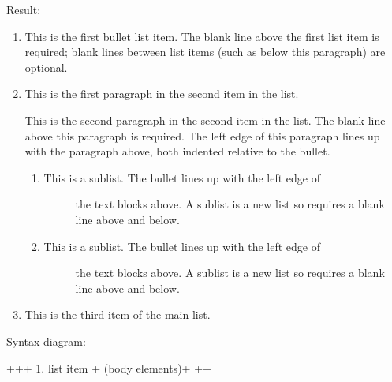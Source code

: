 \documentclass[letterpaper,12pt,english]{sphinxmanual}
\begin{document}
Result:
\begin{enumerate}
\def\theenumi{\arabic{enumi}}
\def\labelenumi{\theenumi .}
\makeatletter\def\p@enumii{\p@enumi \theenumi .}\makeatother
\item {} 
This is the first bullet list item.  The blank line above the
first list item is required; blank lines between list items
(such as below this paragraph) are optional.

\item {} 
This is the first paragraph in the second item in the list.

This is the second paragraph in the second item in the list.
The blank line above this paragraph is required.  The left edge
of this paragraph lines up with the paragraph above, both
indented relative to the bullet.
\begin{enumerate}
\def\theenumii{\alph{enumii}}
\def\labelenumii{\theenumii .}
\makeatletter\def\p@enumiii{\p@enumii \theenumii .}\makeatother
\item {} \begin{description}
\item[{This is a sublist.  The bullet lines up with the left edge of}] \leavevmode
the text blocks above.  A sublist is a new list so requires a
blank line above and below.

\end{description}

\item {} \begin{description}
\item[{This is a sublist.  The bullet lines up with the left edge of}] \leavevmode
the text blocks above.  A sublist is a new list so requires a
blank line above and below.

\end{description}

\end{enumerate}

\item {} 
This is the third item of the main list.

\end{enumerate}

Syntax diagram:

\begin{sphinxVerbatim}[commandchars=\\\{\}]
+\PYGZhy{}\PYGZhy{}\PYGZhy{}\PYGZhy{}\PYGZhy{}\PYGZhy{}\PYGZhy{}+\PYGZhy{}\PYGZhy{}\PYGZhy{}\PYGZhy{}\PYGZhy{}\PYGZhy{}\PYGZhy{}\PYGZhy{}\PYGZhy{}\PYGZhy{}\PYGZhy{}\PYGZhy{}\PYGZhy{}\PYGZhy{}\PYGZhy{}\PYGZhy{}\PYGZhy{}\PYGZhy{}\PYGZhy{}\PYGZhy{}\PYGZhy{}\PYGZhy{}+
 \PYGZdq{}1. \PYGZdq{} \textbar{} list item            \textbar{}
+\PYGZhy{}\PYGZhy{}\PYGZhy{}\PYGZhy{}\PYGZhy{}\PYGZhy{}\PYGZhy{}\textbar{} (body elements)+     \textbar{}
        +\PYGZhy{}\PYGZhy{}\PYGZhy{}\PYGZhy{}\PYGZhy{}\PYGZhy{}\PYGZhy{}\PYGZhy{}\PYGZhy{}\PYGZhy{}\PYGZhy{}\PYGZhy{}\PYGZhy{}\PYGZhy{}\PYGZhy{}\PYGZhy{}\PYGZhy{}\PYGZhy{}\PYGZhy{}\PYGZhy{}\PYGZhy{}\PYGZhy{}+
\end{sphinxVerbatim}
\end{document}
